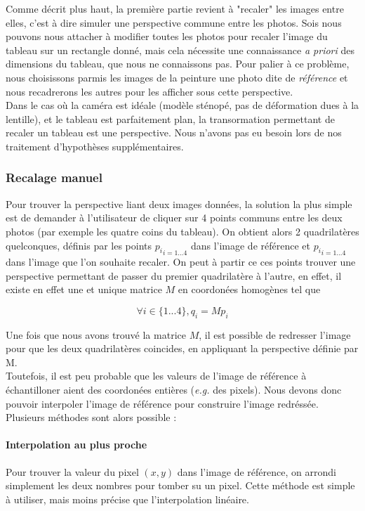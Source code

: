 \documentclass[12pt,a4paper]{article}
\begin{document}
Comme décrit plus haut, la première partie revient à "recaler" les images entre elles, c'est à dire simuler une perspective commune entre les photos. Sois nous pouvons nous attacher à modifier toutes les photos pour recaler l'image du tableau sur un rectangle donné, mais cela nécessite une connaissance \emph{a priori} des dimensions du tableau, que nous ne connaissons pas. Pour palier à ce problème, nous choisissons parmis les images de la peinture une photo dite de \emph{référence} et nous recadrerons les autres pour les afficher sous cette perspective.\\

Dans le cas où la caméra est idéale (modèle sténopé, pas de déformation dues à la lentille), et le tableau est parfaitement plan, la transormation permettant de recaler un tableau est une perspective. Nous n'avons pas eu besoin lors de nos traitement d'hypothèses supplémentaires.

\subsubsection{Recalage manuel}
Pour trouver la perspective liant deux images données, la solution la plus simple est de demander à l'utilisateur de cliquer sur 4 points communs entre les deux photos (par exemple les quatre coins du tableau). On obtient alors 2 quadrilatères quelconques, définis par les points ${p_i}_{i = 1...4}$ dans l'image de référence et ${p_i}_{i = 1...4}$ dans l'image que  l'on souhaite recaler.
On peut à partir ce ces points trouver une perspective permettant de passer du premier quadrilatère à l'autre, en effet, il existe en effet une et unique matrice $M$ en coordonées homogènes tel que

$$ \forall i \in \{1...4\}, q_i = M p_i $$

Une fois que nous avons trouvé la matrice $M$, il est possible de redresser l'image pour que les deux quadrilatères coincides, en appliquant la perspective définie par M. \\

Toutefois, il est peu probable que les valeurs de l'image de référence à échantilloner aient des coordonées entières (\emph{e.g.} des pixels). Nous devons donc pouvoir interpoler l'image de référence pour construire l'image redréssée. Plusieurs méthodes sont alors possible :

\paragraph{Interpolation au plus proche}
Pour trouver la valeur du pixel $(x,y)$ dans l'image de référence, on arrondi simplement les deux nombres pour tomber su un pixel. Cette méthode est simple à utiliser, mais moins précise que l'interpolation linéaire.
\end{document}
